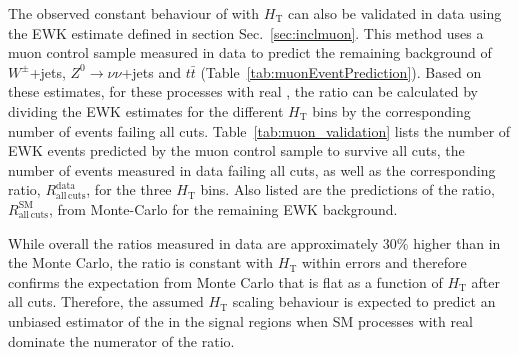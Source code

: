 The observed constant behaviour of \RaT with $H_{\mathrm{T}}$ can also
be validated in data using the EWK estimate defined in section
Sec.~\ref{sec:inclmuon}. This method uses a muon control sample
measured in data to predict the remaining background of
$W^{\pm}$+jets, $Z^{0}\rightarrow\nu\nu$+jets and $t\bar{t}$
(Table~\ref{tab:muonEventPrediction}).  Based on these estimates, for
these processes with real \mymet, the ratio \RaT can be calculated by
dividing the EWK estimates for the different $H_{\mathrm{T}}$ bins by
the corresponding number of events failing all cuts.
Table~\ref{tab:muon_validation} lists the number of EWK events
predicted by the muon control sample to survive all cuts, the number
of events measured in data failing all cuts, as well as the
corresponding ratio, $R^{\mathrm{data}}_{\mathrm{all\, cuts}}$, for
the three $H_{\mathrm{T}}$ bins. Also listed are the predictions of
the ratio, $R^{\mathrm{SM}}_{\mathrm{all\, cuts}}$, from Monte-Carlo
for the remaining EWK background.

While overall the ratios measured in data are approximately 30\%
higher than in the Monte Carlo, the ratio is constant with $H_{\mathrm{T}}$
within errors and therefore confirms the expectation from Monte Carlo
that \RaT is flat as a function of $H_{\mathrm{T}}$ after all
cuts. Therefore, the assumed $H_{\mathrm{T}}$ scaling behaviour is
expected to predict an unbiased estimator of the \RaT in the signal
regions when SM processes with real \mymet dominate the numerator of
the ratio.

